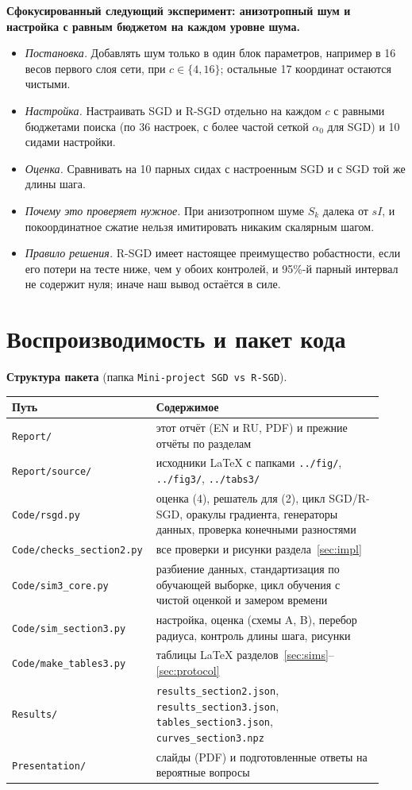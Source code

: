 \documentclass[11pt,a4paper]{article}
\begin{document}
\textbf{Сфокусированный следующий эксперимент: анизотропный шум и настройка с равным бюджетом на
каждом уровне шума.}
\begin{itemize}
\item \emph{Постановка.} Добавлять шум только в один блок параметров, например в 16 весов первого
слоя сети, при $c\in\{4,16\}$; остальные 17 координат остаются чистыми.
\item \emph{Настройка.} Настраивать SGD и R-SGD отдельно на каждом $c$ с равными бюджетами поиска
(по 36 настроек, с более частой сеткой $\alpha_0$ для SGD) и 10 сидами настройки.
\item \emph{Оценка.} Сравнивать на 10 парных сидах с настроенным SGD и с SGD той же длины шага.
\item \emph{Почему это проверяет нужное.} При анизотропном шуме $S_k$ далека от $sI$, и
покоординатное сжатие нельзя имитировать никаким скалярным шагом.
\item \emph{Правило решения.} R-SGD имеет настоящее преимущество робастности, если его потери на
тесте ниже, чем у обоих контролей, и 95\%-й парный интервал не содержит нуля; иначе наш вывод
остаётся в силе.
\end{itemize}


\section{Воспроизводимость и пакет кода}\label{sec:repro}

\textbf{Структура пакета} (папка \texttt{Mini-project SGD vs R-SGD}).
\begin{center}
\small
\begin{tabular}{@{}p{0.33\linewidth}p{0.6\linewidth}@{}}
\toprule
Путь & Содержимое \\
\midrule
\texttt{Report/} & этот отчёт (EN и RU, PDF) и прежние отчёты по разделам \\
\texttt{Report/source/} & исходники LaTeX с папками \texttt{../fig/}, \texttt{../fig3/}, \texttt{../tabs3/} \\
\texttt{Code/rsgd.py} & оценка (4), решатель для (2), цикл SGD/R-SGD, оракулы градиента, генераторы данных, проверка конечными разностями \\
\texttt{Code/checks\_section2.py} & все проверки и рисунки раздела~\ref{sec:impl} \\
\texttt{Code/sim3\_core.py} & разбиение данных, стандартизация по обучающей выборке, цикл обучения с чистой оценкой и замером времени \\
\texttt{Code/sim\_section3.py} & настройка, оценка (схемы A, B), перебор радиуса, контроль длины шага, рисунки \\
\texttt{Code/make\_tables3.py} & таблицы LaTeX разделов~\ref{sec:sims}--\ref{sec:protocol} \\
\texttt{Results/} & \texttt{results\_section2.json}, \texttt{results\_section3.json}, \texttt{tables\_section3.json}, \texttt{curves\_section3.npz} \\
\texttt{Presentation/} & слайды (PDF) и подготовленные ответы на вероятные вопросы \\
\bottomrule
\end{tabular}
\end{center}
\end{document}
